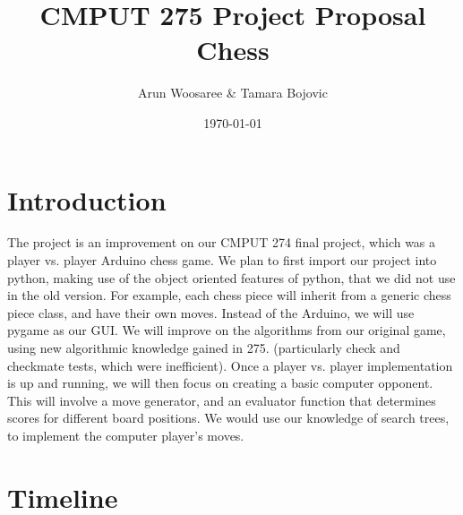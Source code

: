 \documentclass{article}
\title{CMPUT 275 Project Proposal\\
\vspace{.25cm}\large Chess \vspace{-.5cm}}
\author{\LARGE Arun Woosaree  \& Tamara Bojovic}
\date{\today}
\begin{document}
  \maketitle %

  \section{Introduction}
  The project is an improvement on our CMPUT 274 final project, which was a
  player vs. player Arduino chess game. We plan to first import our project into
  python, making use of the object oriented features of python, that we did not
  use in the old version. For example, each chess piece will inherit from a
  generic chess piece class, and have their own moves. Instead of the Arduino,
  we will use pygame as our GUI. We will improve on the algorithms from our
  original game, using new algorithmic knowledge gained in 275. (particularly
  check and checkmate tests, which were inefficient). Once a player vs. player
  implementation is up and running, we will then focus on creating a basic
  computer opponent. This will involve a move generator, and an evaluator
  function that determines scores for different board positions. We would use
  our knowledge of search trees, to implement the computer player’s moves.


  \section{Timeline}
\end{document}
